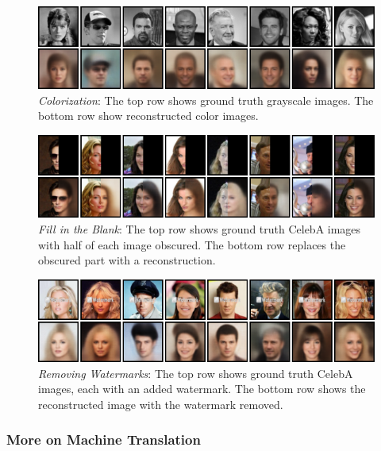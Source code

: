 \begin{figure}[h!]
    \centering
    \includegraphics[width=\linewidth]{images/chapter3/vision/colorization}
    \caption{\textit{Colorization}: The top row shows ground truth grayscale images. The bottom row show reconstructed color images.}
    \label{fig:vision_color}
\end{figure}

\begin{figure}[h!]
    \centering
    \includegraphics[width=\linewidth]{images/chapter3/vision/fill_in_blank}
    \caption{\textit{Fill in the Blank}: The top row shows ground truth CelebA images with half of each image obscured. The bottom row replaces the obscured part with a reconstruction.}
    \label{fig:vision_blank}
\end{figure}

\begin{figure}[h!]
    \centering
    \includegraphics[width=\linewidth]{images/chapter3/vision/watermark}
    \caption{\textit{Removing Watermarks}: The top row shows ground truth CelebA images, each with an added watermark. The bottom row shows the reconstructed image with the watermark removed.}
    \label{fig:vision_watermark}
\end{figure}

\subsubsection{More on Machine Translation}

